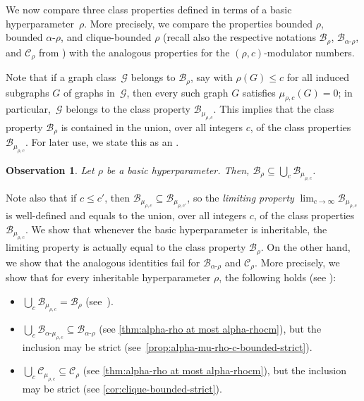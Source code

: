 \documentclass[11pt]{article}
\newcommand{\rhocm}{\mu_{\rho,c}}
\theoremstyle{plain}
\newtheorem{observation}[theorem]{Observation}
\theoremstyle{definition}
\theoremstyle{remark}
\numberwithin{equation}{section}
\begin{document}
We now compare three class properties defined in terms of a basic hyperparameter~$\rho$.
More precisely, we compare the properties bounded $\rho$, bounded $\alpha$-$\rho$, and clique-bounded $\rho$ (recall also the respective notations $\mathcal{B}_{\rho}$, $\mathcal{B}_{\alpha\text{-}\rho}$, and $\mathcal{C}_{\rho}$ from ) with the analogous properties for the $(\rho,c)$-modulator numbers.

Note that if a graph class~$\mathcal{G}$ belongs to $\mathcal{B}_{\rho}$, say with $\rho(G)\le c$ for all induced subgraphs $G$ of graphs in~$\mathcal{G}$, then every such graph $G$ satisfies $\rhocm(G) = 0$; in particular,~$\mathcal{G}$ belongs to the class property $\mathcal{B}_{\rhocm}$.
This implies that the class property $\mathcal{B}_{\rho}$ is contained in the union, over all integers $c$, of the class properties $\mathcal{B}_{\rhocm}$. 
For later use, we state this as an .
\begin{observation}\label{obs:class-property}
Let $\rho$ be a basic hyperparameter. 
Then, $\mathcal{B}_{\rho} \subseteq \bigcup_{c}\mathcal{B}_{\rhocm}$.
\end{observation}
Note also that if $c \le c'$, then $\mathcal{B}_{\rhocm}\subseteq \mathcal{B}_{\mu_{\rho,c'}}$, so the \emph{limiting property} $\lim_{c\to \infty}\mathcal{B}_{\rhocm}$ is well-defined and equals to the union, over all integers $c$, of the class properties $\mathcal{B}_{\rhocm}$.
We show that whenever the basic hyperparameter is inheritable, the limiting property is actually equal to the class property $\mathcal{B}_{\rho}$. 
On the other hand, we show that the analogous identities fail for $\mathcal{B}_{\alpha\text{-}\rho}$ and $\mathcal{C}_{\rho}$.
More precisely, we show that for every inheritable hyperparameter $\rho$, the following holds (see ): 
\begin{itemize}
    \item $\bigcup_{c}\mathcal{B}_{\rhocm} = \mathcal{B}_{\rho}$ (see~).
   \item $\bigcup_{c}\mathcal{B}_{\alpha\text{-}\rhocm}\subseteq \mathcal{B}_{\alpha\text{-}\rho}$ (see \cref{thm:alpha-rho at most alpha-rhocm}), but the inclusion may be strict (see~\cref{prop:alpha-mu-rho-c-bounded-strict}).
    \item $\bigcup_{c}\mathcal{C}_{\rhocm}\subseteq \mathcal{C}_{\rho}$ (see \cref{thm:alpha-rho at most alpha-rhocm}), but the inclusion may be strict (see \cref{cor:clique-bounded-strict}).
\end{itemize}
\end{document}
